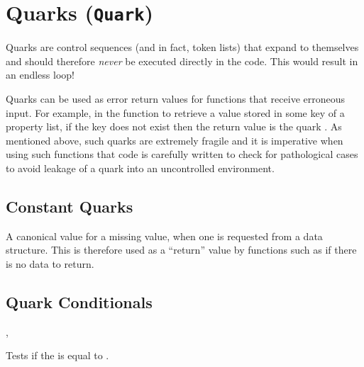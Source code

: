 \documentclass[oneside]{book}
\begin{document}
\chapter{Quarks (\texttt{Quark})}


Quarks are control sequences (and in fact, token lists) that expand
to themselves and should therefore \emph{never} be executed directly
in the code. This would result in an endless loop!

Quarks can be used as error return values for functions that receive erroneous input.
For example, in the function  to retrieve a value stored
in some key of a property list, if the key does not exist then the return value
is the quark .
As mentioned above, such quarks are extremely fragile and it is imperative
when using such functions that code is carefully written to check for
pathological cases to avoid leakage of a quark into an uncontrolled
environment.

\section{Constant Quarks}

\begin{variable}{\qNoValue}
A canonical value for a missing value, when one is requested from
a data structure. This is therefore used as a \enquote{return} value
by functions such as  if there is no data to return.
\end{variable}

\section{Quark Conditionals}

\begin{function}{\QuarkVarIfNoValue,\QuarkVarIfNoValueTF}
\begin{syntax}
 
   
\end{syntax}
Tests if the  is equal to .
\begin{demohigh}
\ClistGet \cEmptyClist \lTmpaTl
\QuarkVarIfNoValueTF {} {}
\end{demohigh}
\begin{demohigh}
\SeqPop \cEmptySeq \lTmpaTl
\QuarkVarIfNoValueTF {} {}
\end{demohigh}
\begin{demohigh}
\PropSetFromKeyval {}
\PropGet {} \lTmpaTl
\QuarkVarIfNoValueTF {} {}
\end{demohigh}
\end{function}
\end{document}

